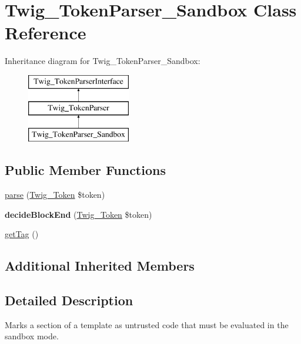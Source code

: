 \hypertarget{class_twig___token_parser___sandbox}{}\section{Twig\+\_\+\+Token\+Parser\+\_\+\+Sandbox Class Reference}
\label{class_twig___token_parser___sandbox}
Inheritance diagram for Twig\+\_\+\+Token\+Parser\+\_\+\+Sandbox\+:\begin{figure}[H]
\begin{center}
\leavevmode
\includegraphics[height=3.000000cm]{class_twig___token_parser___sandbox}
\end{center}
\end{figure}
\subsection*{Public Member Functions}
\begin{DoxyCompactItemize}
\item 
\hyperlink{class_twig___token_parser___sandbox_a5dfa2e269321584fb74e8b43dabe0efd}{parse} (\hyperlink{class_twig___token}{Twig\+\_\+\+Token} \$token)
\item 
\hypertarget{class_twig___token_parser___sandbox_aa976dc013d35c2813752149bacd88902}{}{\bfseries decide\+Block\+End} (\hyperlink{class_twig___token}{Twig\+\_\+\+Token} \$token)\label{class_twig___token_parser___sandbox_aa976dc013d35c2813752149bacd88902}

\item 
\hyperlink{class_twig___token_parser___sandbox_ab86ba36154b20e6bbfa3ba705f12f9d6}{get\+Tag} ()
\end{DoxyCompactItemize}
\subsection*{Additional Inherited Members}


\subsection{Detailed Description}
Marks a section of a template as untrusted code that must be evaluated in the sandbox mode.


